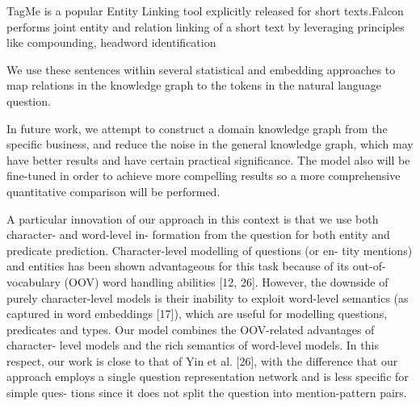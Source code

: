 


TagMe is a popular Entity Linking tool explicitly released for short texts\cite{tagme}.Falcon performs joint entity and relation linking of a short text by leveraging principles like compounding, headword identification


We use these sentences within several statistical and embedding approaches to map relations in the knowledge graph to the tokens in the natural language question.
 
 
 
 
 In future work, we attempt to construct a domain knowledge graph from the specific business, and reduce the noise in the general knowledge graph, which may have better results and have certain practical significance. The model also will be fine-tuned in order to achieve more compelling results so a more comprehensive quantitative comparison will be performed.
 
 
 
 
 
 A particular innovation of our approach in this context is that we use both character- and word-level in- formation from the question for both entity and predicate prediction. Character-level modelling of questions (or en- tity mentions) and entities has been shown advantageous for this task because of its out-of-vocabulary (OOV) word handling abilities [12, 26]. However, the downside of purely character-level models is their inability to exploit word-level semantics (as captured in word embeddings [17]), which are useful for modelling questions, predicates and types. Our model combines the OOV-related advantages of character- level models and the rich semantics of word-level models. In this respect, our work is close to that of Yin et al. [26], with the difference that our approach employs a single question representation network and is less specific for simple ques- tions since it does not split the question into mention-pattern pairs.
 
